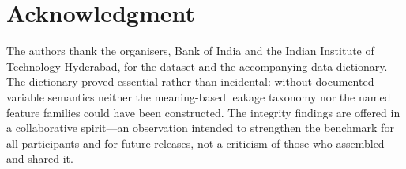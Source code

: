 \documentclass{article}
\begin{document}
\section{Acknowledgment}

The authors thank the organisers, Bank of India and the Indian Institute of
Technology Hyderabad, for the dataset and the accompanying data dictionary. The
dictionary proved essential rather than incidental: without documented variable
semantics neither the meaning-based leakage taxonomy nor the named feature
families could have been constructed. The integrity findings are offered in a
collaborative spirit---an observation intended to strengthen the benchmark for
all participants and for future releases, not a criticism of those who assembled
and shared it.



\end{document}
